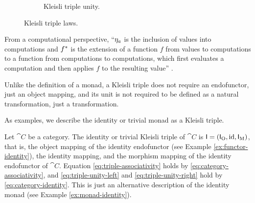 \begin{definition}
\begin{figure}[htb]
\begin{subfigure}[b]{0.45\linewidth}
\begin{center}
      \end{center}
      \caption{Kleisli triple unity.}
      \label{fig:triple-unity}
    \end{subfigure}
    \caption{Kleisli triple laws.}
  \end{figure}

\end{definition}

\begin{remark}
  \label{re:triple}

  From a computational perspective, ``$\natO{\eta}{a}$ is the
  inclusion of values into computations and $\monM{T}{f}$ is the
  extension of a function $f$ from values to computations to a
  function from computations to computations, which first evaluates a
  computation and then applies $f$ to the resulting value''
  \parencite[59]{moggi-1991}.

\end{remark}

\begin{remark}
  \label{re:monad-triple}

  Unlike the definition of a monad, a Kleisli triple does not require
  an endofunctor, just an object mapping, and its unit is not required
  to be defined as a natural transformation, just a transformation.

\end{remark}

As examples, we describe the identity or trivial monad as a Kleisli
triple.

\begin{example}
  \label{ex:triple-identity}

  Let $\cat{C}$ be a category. The identity or trivial Kleisli triple
  of $\cat{C}$ is $\mon{I} = (\funcO{I}, \id, \funcM{I})$, that is,
  the object mapping of the identity endofunctor (see Example
  \ref{ex:functor-identity}), the identity mapping, and the morphism
  mapping of the identity endofunctor of $\cat{C}$. Equation
  \eqref{eq:triple-associativity} holds by
  \eqref{eq:category-associativity}, and \eqref{eq:triple-unity-left}
  and \eqref{eq:triple-unity-right} hold by
  \eqref{eq:category-identity}. This is just an alternative
  description of the identity monad (see Example
  \ref{ex:monad-identity}).

\end{example}

